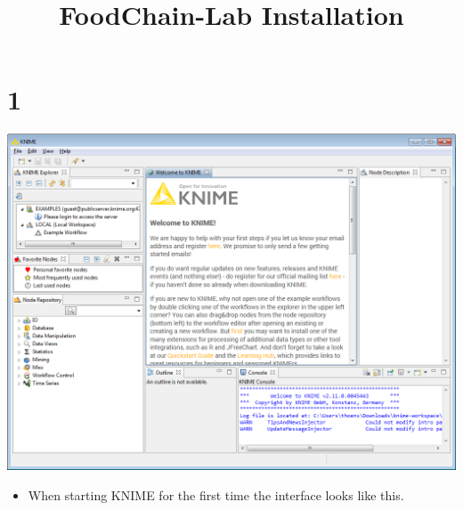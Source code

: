 \documentclass{beamer}
\title{FoodChain-Lab Installation}
\date{}
\begin{document}
\maketitle
 
\section{1}
\begin{frame}
	\begin{center}
  		\includegraphics[height=0.7\textheight]{1.png}
	\end{center}
	\begin{itemize}
		\item When starting KNIME for the first time the interface looks like this.
	\end{itemize}
\end{frame}
\end{document}
